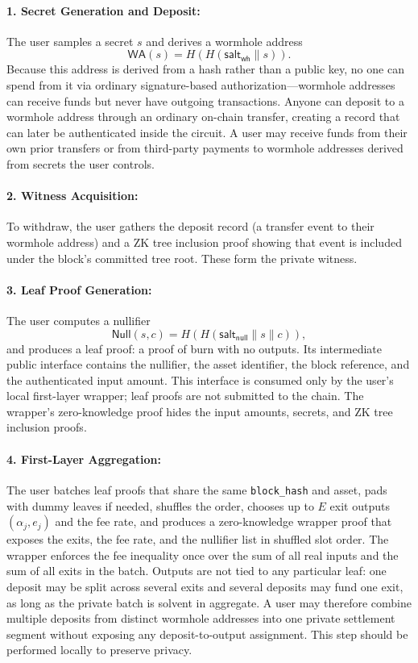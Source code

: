 \documentclass{iacrcc}
\newcommand{\WA}{\mathsf{WA}}
\newcommand{\Null}{\mathsf{Null}}
\begin{document}
\paragraph{1. Secret Generation and Deposit:}
The user samples a secret \(s\) and derives a wormhole address
\[
\WA(s) = H(H(\mathsf{salt_{wh}} \parallel s)).
\]
Because this address is derived from a hash rather than a public key, no one can spend from it via ordinary signature-based authorization—wormhole addresses can receive funds but never have outgoing transactions. Anyone can deposit to a wormhole address through an ordinary on-chain transfer, creating a record that can later be authenticated inside the circuit. A user may receive funds from their own prior transfers or from third-party payments to wormhole addresses derived from secrets the user controls.

\paragraph{2. Witness Acquisition:}
To withdraw, the user gathers the deposit record (a transfer event to their wormhole address) and a ZK tree inclusion proof showing that event is included under the block's committed tree root. These form the private witness.

\paragraph{3. Leaf Proof Generation:}
The user computes a nullifier
\[
\Null(s,c) = H(H(\mathsf{salt_{null}} \parallel s \parallel c)),
\]
and produces a leaf proof: a proof of burn with no outputs. Its intermediate public interface contains the nullifier, the asset identifier, the block reference, and the authenticated input amount. This interface is consumed only by the user's local first-layer wrapper; leaf proofs are not submitted to the chain. The wrapper's zero-knowledge proof hides the input amounts, secrets, and ZK tree inclusion proofs.

\paragraph{4. First-Layer Aggregation:}
The user batches leaf proofs that share the same \texttt{block\_hash} and asset, pads with dummy leaves if needed, shuffles the order, chooses up to \(E\) exit outputs \((\alpha_j, e_j)\) and the fee rate, and produces a zero-knowledge wrapper proof that exposes the exits, the fee rate, and the nullifier list in shuffled slot order. The wrapper enforces the fee inequality once over the sum of all real inputs and the sum of all exits in the batch. Outputs are not tied to any particular leaf: one deposit may be split across several exits and several deposits may fund one exit, as long as the private batch is solvent in aggregate. A user may therefore combine multiple deposits from distinct wormhole addresses into one private settlement segment without exposing any deposit-to-output assignment. This step should be performed locally to preserve privacy.
\end{document}

